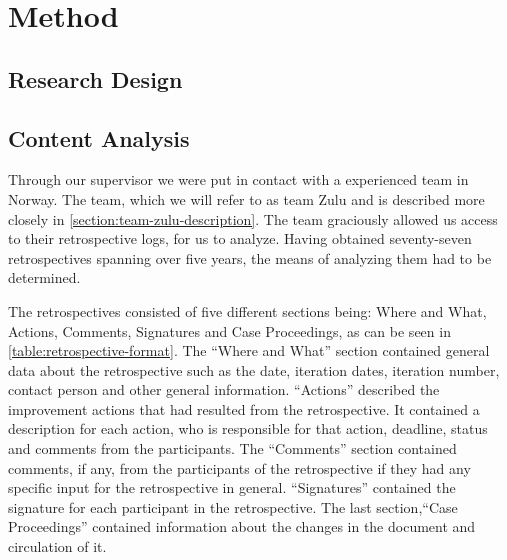 \chapter{Method}
\section{Research Design}

\section{Content Analysis}
Through our supervisor we were put in contact with a experienced team in Norway. The team, which we will refer to as team Zulu and is described more closely in \autoref{section:team-zulu-description}. The team graciously allowed us access to their retrospective logs, for us to analyze.
Having obtained seventy-seven retrospectives spanning over five years, the means of analyzing them had to be determined. 

The retrospectives consisted of five different sections being: Where and What, Actions, Comments, Signatures and Case Proceedings, as can be seen in \autoref{table:retrospective-format}. 
The ``Where and What'' section contained general data about the retrospective such as the date, iteration dates, iteration number, contact person and other general information. ``Actions'' described the improvement actions that had resulted from the retrospective. It contained a description for each action, who is responsible for that action, deadline, status and comments from the participants. The ``Comments'' section contained comments, if any, from the participants of the retrospective if they had any specific input for the retrospective in general. ``Signatures'' contained the signature for each participant in the retrospective. The last section,``Case Proceedings'' contained information about the changes in the document and circulation of it.

\begin{table}[!h]
	\begin{center}
	\caption{The section of the retrospectives}
	\label{table:retrospective-format}
\end{center}
\end{table}

